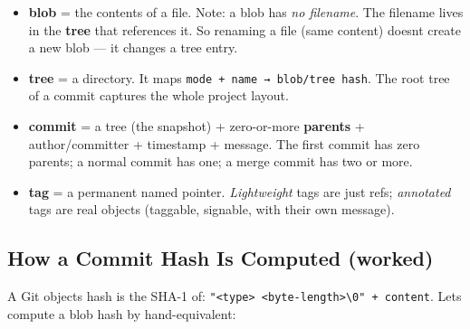 \documentclass[11pt]{article}
\providecommand{\tightlist}{\setlength{\itemsep}{1pt}\setlength{\parskip}{0pt}}
\newenvironment{Shaded}{\begin{snugshade}}{\end{snugshade}}
\newcommand{\AttributeTok}[1]{\textcolor[rgb]{0.16,0.50,0.73}{#1}}
\newcommand{\CommentTok}[1]{\textcolor[rgb]{0.48,0.49,0.49}{#1}}
\newcommand{\ExtensionTok}[1]{\textcolor[rgb]{0.00,0.60,1.00}{\textbf{#1}}}
\newcommand{\FunctionTok}[1]{\textcolor[rgb]{0.56,0.27,0.68}{#1}}
\newcommand{\KeywordTok}[1]{\textcolor[rgb]{0.81,0.81,0.76}{\textbf{#1}}}
\newcommand{\NormalTok}[1]{\textcolor[rgb]{0.81,0.81,0.76}{#1}}
\newcommand{\StringTok}[1]{\textcolor[rgb]{0.96,0.31,0.31}{#1}}
\begin{document}
\begin{itemize}
\tightlist
\item
  \textbf{blob} = the contents of a file. Note: a blob has \emph{no filename}. The filename lives in the \textbf{tree} that references it. So renaming a file (same content) doesn\textquotesingle t create a new blob --- it changes a tree entry.
\item
  \textbf{tree} = a directory. It maps \texttt{mode\ +\ name\ →\ blob/tree\ hash}. The root tree of a commit captures the whole project layout.
\item
  \textbf{commit} = a tree (the snapshot) + zero-or-more \textbf{parents} + author/committer + timestamp + message. The first commit has zero parents; a normal commit has one; a merge commit has two or more.
\item
  \textbf{tag} = a permanent named pointer. \emph{Lightweight} tags are just refs; \emph{annotated} tags are real objects (taggable, signable, with their own message).
\end{itemize}

\subsection{How a Commit Hash Is Computed (worked)}\label{how-a-commit-hash-is-computed-worked}

A Git object\textquotesingle s hash is the SHA-1 of: \texttt{"\textless{}type\textgreater{}\ \textless{}byte-length\textgreater{}\textbackslash{}0"\ +\ content}. Let\textquotesingle s compute a blob hash by hand-equivalent:


\begin{Shaded}
\end{Shaded}
\end{document}
